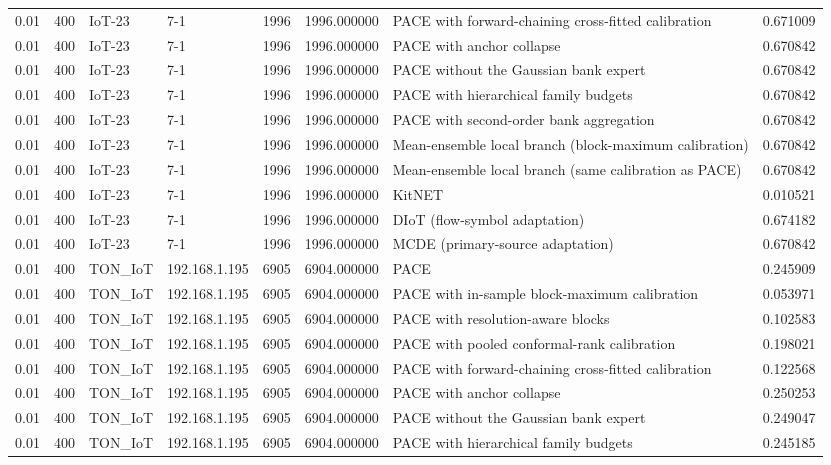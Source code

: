\begin{tabular}{llllllll}
0.01 & 400 & IoT-23 & 7-1 & 1996 & 1996.000000 & PACE with forward-chaining cross-fitted calibration & 0.671009 \\
0.01 & 400 & IoT-23 & 7-1 & 1996 & 1996.000000 & PACE with anchor collapse & 0.670842 \\
0.01 & 400 & IoT-23 & 7-1 & 1996 & 1996.000000 & PACE without the Gaussian bank expert & 0.670842 \\
0.01 & 400 & IoT-23 & 7-1 & 1996 & 1996.000000 & PACE with hierarchical family budgets & 0.670842 \\
0.01 & 400 & IoT-23 & 7-1 & 1996 & 1996.000000 & PACE with second-order bank aggregation & 0.670842 \\
0.01 & 400 & IoT-23 & 7-1 & 1996 & 1996.000000 & Mean-ensemble local branch (block-maximum calibration) & 0.670842 \\
0.01 & 400 & IoT-23 & 7-1 & 1996 & 1996.000000 & Mean-ensemble local branch (same calibration as PACE) & 0.670842 \\
0.01 & 400 & IoT-23 & 7-1 & 1996 & 1996.000000 & KitNET & 0.010521 \\
0.01 & 400 & IoT-23 & 7-1 & 1996 & 1996.000000 & DIoT (flow-symbol adaptation) & 0.674182 \\
0.01 & 400 & IoT-23 & 7-1 & 1996 & 1996.000000 & MCDE (primary-source adaptation) & 0.670842 \\
0.01 & 400 & TON\_IoT & 192.168.1.195 & 6905 & 6904.000000 & PACE & 0.245909 \\
0.01 & 400 & TON\_IoT & 192.168.1.195 & 6905 & 6904.000000 & PACE with in-sample block-maximum calibration & 0.053971 \\
0.01 & 400 & TON\_IoT & 192.168.1.195 & 6905 & 6904.000000 & PACE with resolution-aware blocks & 0.102583 \\
0.01 & 400 & TON\_IoT & 192.168.1.195 & 6905 & 6904.000000 & PACE with pooled conformal-rank calibration & 0.198021 \\
0.01 & 400 & TON\_IoT & 192.168.1.195 & 6905 & 6904.000000 & PACE with forward-chaining cross-fitted calibration & 0.122568 \\
0.01 & 400 & TON\_IoT & 192.168.1.195 & 6905 & 6904.000000 & PACE with anchor collapse & 0.250253 \\
0.01 & 400 & TON\_IoT & 192.168.1.195 & 6905 & 6904.000000 & PACE without the Gaussian bank expert & 0.249047 \\
0.01 & 400 & TON\_IoT & 192.168.1.195 & 6905 & 6904.000000 & PACE with hierarchical family budgets & 0.245185 \\

\end{tabular}
